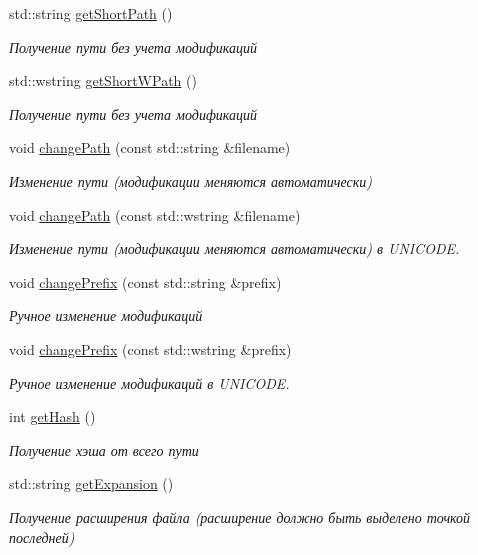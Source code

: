 \begin{DoxyCompactItemize}
std\+::string \hyperlink{class_path_class_a152fffeff3269d3fbcec37be7fc8b9a7}{get\+Short\+Path} ()
\begin{DoxyCompactList}\small\item\em Получение пути без учета модификаций \end{DoxyCompactList}\item 
std\+::wstring \hyperlink{class_path_class_ae6687a83d981a24ff5f4f0e2cb3f1914}{get\+Short\+W\+Path} ()
\begin{DoxyCompactList}\small\item\em Получение пути без учета модификаций \end{DoxyCompactList}\item 
void \hyperlink{class_path_class_a86c71455f3a42e46f3f29d8c289d3e6d}{change\+Path} (const std\+::string \&filename)
\begin{DoxyCompactList}\small\item\em Изменение пути (модификации меняются автоматически) \end{DoxyCompactList}\item 
void \hyperlink{class_path_class_a8eaba9bf62b07b9ad641c28ff17a9817}{change\+Path} (const std\+::wstring \&filename)
\begin{DoxyCompactList}\small\item\em Изменение пути (модификации меняются автоматически) в U\+N\+I\+C\+O\+DE. \end{DoxyCompactList}\item 
void \hyperlink{class_path_class_a2ca417e8d9cc0e071470b00681a834d8}{change\+Prefix} (const std\+::string \&prefix)
\begin{DoxyCompactList}\small\item\em Ручное изменение модификаций \end{DoxyCompactList}\item 
void \hyperlink{class_path_class_a078c9eafbd2ef04faa7df37fde842cb8}{change\+Prefix} (const std\+::wstring \&prefix)
\begin{DoxyCompactList}\small\item\em Ручное изменение модификаций в U\+N\+I\+C\+O\+DE. \end{DoxyCompactList}\item 
int \hyperlink{class_path_class_aba7fd7fbc4fd3d093a91c9d57590887b}{get\+Hash} ()
\begin{DoxyCompactList}\small\item\em Получение хэша от всего пути \end{DoxyCompactList}\item 
std\+::string \hyperlink{class_path_class_a4a5fc3904f0d147a0dbab055c0b9c143}{get\+Expansion} ()
\begin{DoxyCompactList}\small\item\em Получение расширения файла (расширение должно быть выделено точкой последней) \end{DoxyCompactList}\end{DoxyCompactItemize}
